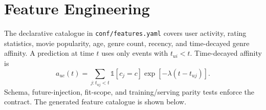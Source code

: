 \section{Feature Engineering}
The declarative catalogue in \texttt{conf/features.yaml} covers user activity,
rating statistics, movie popularity, age, genre count, recency, and
time-decayed genre affinity. A prediction at time $t$ uses only events with
$t_{ui}<t$. Time-decayed affinity is
\[
a_{uc}(t)=\sum_{j:t_{uj}<t}\mathbb{1}[c_j=c]
          \exp[-\lambda(t-t_{uj})].
\]
Schema, future-injection, fit-scope, and training/serving parity tests enforce
the contract. The generated feature catalogue is shown below.
\scriptsize\normalsize
